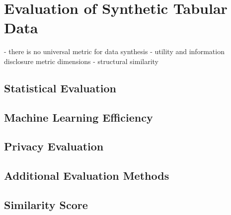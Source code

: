 

\section{Evaluation of Synthetic Tabular Data}
\label{ch:preliminaries-evaluationOfSyntheticTabularData}

- there is no universal metric for data synthesis \cite{hernandez2022SyntheticDataGeneration}
- utility and information disclosure metric dimensions \cite{goncalves2020GenerationEvaluationSynthetic}
- structural similarity \cite{elemam2020SevenWaysEvaluate}

\subsection{Statistical Evaluation}
\label{ch:preliminaries-evaluationOfSyntheticTabularData-statisticalEvaluation}

\subsection{Machine Learning Efficiency}
\label{ch:preliminaries-evaluationOfSyntheticTabularData-machineLearningEfficiency}

\subsection{Privacy Evaluation}
\label{ch:preliminaries-evaluationOfSyntheticTabularData-privacyEvaluation}

\subsection{Additional Evaluation Methods}
\label{ch:preliminaries-evaluationOfSyntheticTabularData-otherMetrics}


\subsection{Similarity Score}
\label{ch:preliminaries-evaluationOfSyntheticTabularData-similarityScore}






